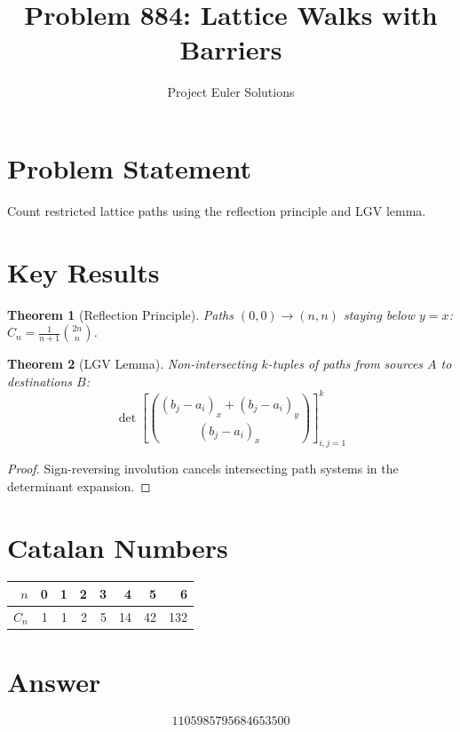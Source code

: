 \documentclass[11pt]{article}
\title{Problem 884: Lattice Walks with Barriers}
\author{Project Euler Solutions}
\date{}
\newtheorem{theorem}{Theorem}
\begin{document}
\maketitle

\section{Problem Statement}
Count restricted lattice paths using the reflection principle and LGV lemma.

\section{Key Results}

\begin{theorem}[Reflection Principle]
Paths $(0,0) \to (n,n)$ staying below $y=x$: $C_n = \frac{1}{n+1}\binom{2n}{n}$.
\end{theorem}

\begin{theorem}[LGV Lemma]
Non-intersecting $k$-tuples of paths from sources $A$ to destinations $B$:
\[
\det\left[\binom{(b_j - a_i)_x + (b_j - a_i)_y}{(b_j - a_i)_x}\right]_{i,j=1}^{k}
\]
\end{theorem}

\begin{proof}
Sign-reversing involution cancels intersecting path systems in the determinant expansion.
\end{proof}

\section{Catalan Numbers}
\begin{center}
\begin{tabular}{r|rrrrrrr}
$n$ & 0 & 1 & 2 & 3 & 4 & 5 & 6 \\ \hline
$C_n$ & 1 & 1 & 2 & 5 & 14 & 42 & 132
\end{tabular}
\end{center}

\section{Answer}

\[
\boxed{1105985795684653500}
\]
\end{document}

